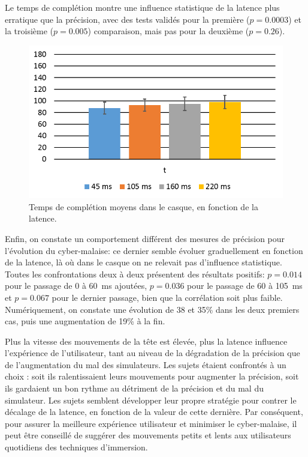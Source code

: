 	\par Le temps de complétion montre une influence statistique de la latence plus erratique que la précision, avec des tests validés pour la première ($p = 0.0003$) et la troisième ($p = 0.005$) comparaison, mais pas pour la deuxième ($p = 0.26$).
	
	\begin{figure}[h]
		\centering
		\includegraphics[width=0.8\linewidth]{Figures/CasqueCompletionTimeResults.png}
		\caption{Temps de complétion moyens dans le casque, en fonction de la latence.}
		\label{fig:casque_completion_time}
	\end{figure}
	
	
	\par Enfin, on constate un comportement différent des mesures de précision pour l'évolution du cyber-malaise: ce dernier semble évoluer graduellement en fonction de la latence, là où dans le casque on ne relevait pas d'influence statistique. Toutes les confrontations deux à deux présentent des résultats positifs: $p = 0.014$ pour le passage de 0 à 60~ms ajoutées, $p = 0.036$ pour le passage de 60 à 105~ms et $p = 0.067$ pour le dernier passage, bien que la corrélation soit plus faible. Numériquement, on constate une évolution de 38 et 35\% dans les deux premiers cas, puis une augmentation de 19\% à la fin.
	
	\par Plus la vitesse des mouvements de la tête est élevée, plus la latence influence l'expérience de l'utilisateur, tant au niveau de la dégradation de la précision que de l'augmentation du mal des simulateurs. Les sujets étaient confrontés à un choix : soit ils ralentissaient leurs mouvements pour augmenter la précision, soit ils gardaient un bon rythme au détriment de la précision et du mal du simulateur. Les sujets semblent développer leur propre stratégie pour contrer le décalage de la latence, en fonction de la valeur de cette dernière. Par conséquent, pour assurer la meilleure expérience utilisateur et minimiser le cyber-malaise, il peut être conseillé de suggérer des mouvements petits et lents aux utilisateurs quotidiens des techniques d'immersion.	
	
